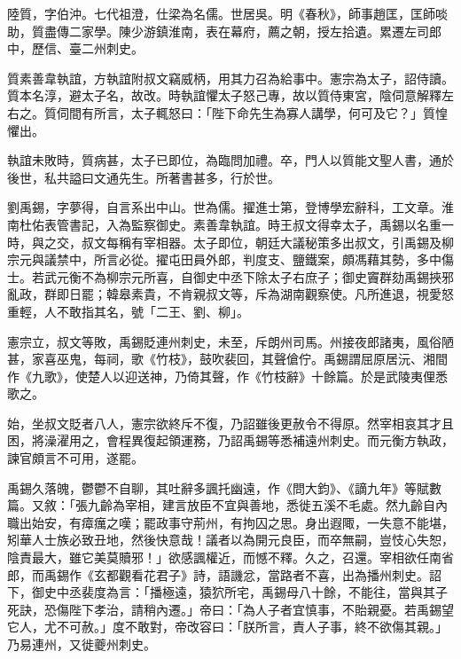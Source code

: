 \begin{pinyinscope}
 陸質，字伯沖。七代祖澄，仕梁為名儒。世居吳。明《春秋》，師事趙匡，匡師啖助，質盡傳二家學。陳少游鎮淮南，表在幕府，薦之朝，授左拾遺。累遷左司郎中，歷信、臺二州刺史。



 質素善韋執誼，方執誼附叔文竊威柄，用其力召為給事中。憲宗為太子，詔侍讀。質本名淳，避太子名，故改。時執誼懼太子怒己專，故以質侍東宮，陰伺意解釋左右之。質伺間有所言，太子輒怒曰：「陛下命先生為寡人講學，何可及它？」質惶懼出。



 執誼未敗時，質病甚，太子已即位，為臨問加禮。卒，門人以質能文聖人書，通於後世，私共謚曰文通先生。所著書甚多，行於世。



 劉禹錫，字夢得，自言系出中山。世為儒。擢進士第，登博學宏辭科，工文章。淮南杜佑表管書記，入為監察御史。素善韋執誼。時王叔文得幸太子，禹錫以名重一時，與之交，叔文每稱有宰相器。太子即位，朝廷大議秘策多出叔文，引禹錫及柳宗元與議禁中，所言必從。擢屯田員外郎，判度支、鹽鐵案，頗馮藉其勢，多中傷士。若武元衡不為柳宗元所喜，自御史中丞下除太子右庶子；御史竇群劾禹錫挾邪亂政，群即日罷；韓皋素貴，不肯親叔文等，斥為湖南觀察使。凡所進退，視愛怒重輕，人不敢指其名，號「二王、劉、柳」。



 憲宗立，叔文等敗，禹錫貶連州刺史，未至，斥朗州司馬。州接夜郎諸夷，風俗陋甚，家喜巫鬼，每祠，歌《竹枝》，鼓吹裴回，其聲傖佇。禹錫謂屈原居沅、湘間作《九歌》，使楚人以迎送神，乃倚其聲，作《竹枝辭》十餘篇。於是武陵夷俚悉歌之。



 始，坐叔文貶者八人，憲宗欲終斥不復，乃詔雖後更赦令不得原。然宰相哀其才且困，將澡濯用之，會程異復起領運務，乃詔禹錫等悉補遠州刺史。而元衡方執政，諫官頗言不可用，遂罷。



 禹錫久落魄，鬱鬱不自聊，其吐辭多諷托幽遠，作《問大鈞》、《謫九年》等賦數篇。又敘：「張九齡為宰相，建言放臣不宜與善地，悉徙五溪不毛處。然九齡自內職出始安，有瘴癘之嘆；罷政事守荊州，有拘囚之思。身出遐陬，一失意不能堪，矧華人士族必致丑地，然後快意哉！議者以為開元良臣，而卒無嗣，豈忮心失恕，陰責最大，雖它美莫贖邪！」欲感諷權近，而憾不釋。久之，召還。宰相欲任南省郎，而禹錫作《玄都觀看花君子》詩，語譏忿，當路者不喜，出為播州刺史。詔下，御史中丞裴度為言：「播極遠，猿狖所宅，禹錫母八十餘，不能往，當與其子死訣，恐傷陛下孝治，請稍內遷。」帝曰：「為人子者宜慎事，不貽親憂。若禹錫望它人，尤不可赦。」度不敢對，帝改容曰：「朕所言，責人子事，終不欲傷其親。」乃易連州，又徙夔州刺史。




\end{pinyinscope}
